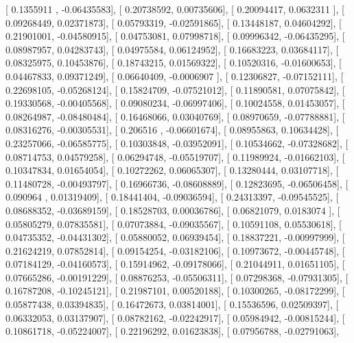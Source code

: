 \documentclass{article}
\begin{document}
       [ 0.1355911 , -0.06435583],
       [ 0.20738592,  0.00735606],
       [ 0.20094417,  0.0632311 ],
       [ 0.09268449,  0.02371873],
       [ 0.05793319, -0.02591865],
       [ 0.13448187,  0.04604292],
       [ 0.21901001, -0.04580915],
       [ 0.04753081,  0.07998718],
       [ 0.09996342, -0.06435295],
       [ 0.08987957,  0.04283743],
       [ 0.04975584,  0.06124952],
       [ 0.16683223,  0.03684117],
       [ 0.08325975,  0.10453876],
       [ 0.18743215,  0.01569322],
       [ 0.10520316, -0.01600653],
       [ 0.04467833,  0.09371249],
       [ 0.06640409, -0.0006907 ],
       [ 0.12306827, -0.07152111],
       [ 0.22698105, -0.05268124],
       [ 0.15824709, -0.07521012],
       [ 0.11890581,  0.07075842],
       [ 0.19330568, -0.00405568],
       [ 0.09080234, -0.06997406],
       [ 0.10024558,  0.01453057],
       [ 0.08264987, -0.08480484],
       [ 0.16468066,  0.03040769],
       [ 0.08970659, -0.07788881],
       [ 0.08316276, -0.00305531],
       [ 0.206516  , -0.06601674],
       [ 0.08955863,  0.10634428],
       [ 0.23257066, -0.06585775],
       [ 0.10303848, -0.03952091],
       [ 0.10534662, -0.07328682],
       [ 0.08714753,  0.04579258],
       [ 0.06294748, -0.05519707],
       [ 0.11989924, -0.01662103],
       [ 0.10347834,  0.01654054],
       [ 0.10272262,  0.06065307],
       [ 0.13280444,  0.03107718],
       [ 0.11480728, -0.00493797],
       [ 0.16966736, -0.08608889],
       [ 0.12823695, -0.06506458],
       [ 0.090964  ,  0.01319409],
       [ 0.18441404, -0.09036594],
       [ 0.24313397, -0.09545525],
       [ 0.08688352, -0.03689159],
       [ 0.18528703,  0.00036786],
       [ 0.06821079,  0.0183074 ],
       [ 0.05805279,  0.07835581],
       [ 0.07073884, -0.09035567],
       [ 0.10591108,  0.05530618],
       [ 0.04735352, -0.04431302],
       [ 0.05880052,  0.06939454],
       [ 0.18837221, -0.00997999],
       [ 0.21624219,  0.07852814],
       [ 0.09154254, -0.03182106],
       [ 0.10973672, -0.00445748],
       [ 0.07184129, -0.04160573],
       [ 0.15914962, -0.09178066],
       [ 0.21044911,  0.01651105],
       [ 0.07665286, -0.00191229],
       [ 0.08876253, -0.05506311],
       [ 0.07298368, -0.07931305],
       [ 0.16787208, -0.10245121],
       [ 0.21987101,  0.00520188],
       [ 0.10300265, -0.08172299],
       [ 0.05877438,  0.03394835],
       [ 0.16472673,  0.03814001],
       [ 0.15536596,  0.02509397],
       [ 0.06332053,  0.03137907],
       [ 0.08782162, -0.02242917],
       [ 0.05984942, -0.00815244],
       [ 0.10861718, -0.05224007],
       [ 0.22196292,  0.01623838],
       [ 0.07956788, -0.02791063],
\end{document}
